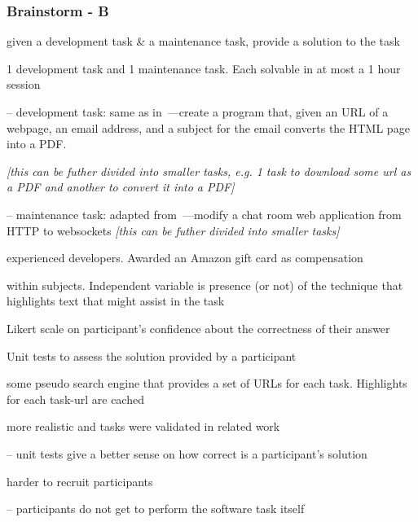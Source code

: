 \clearpage

\subsubsection{Brainstorm - B}

\begin{description}[leftmargin=\parindent, font=\normalfont\itshape]

    
    \item[procedures:] given a development task \& a maintenance task, provide a solution to the task

    
    \item[tasks:] 1 development task and 1 maintenance task. Each solvable in at most a 1 hour session
    
    -- development task: same as in~\cite{Ponzanelli2014b}---create a program that, given an URL of a webpage, an email address, and a subject for the email
    converts the HTML page into a PDF. 
    
    \textit{[this can be futher divided into smaller tasks, e.g. 1 task to download some url as a PDF and another to convert it into a PDF]}
    
    -- maintenance task: adapted from~\cite{Brandt2009a}---modify a chat room web application from HTTP to websockets \textit{[this can be futher divided into smaller tasks]}
    
    
    \item[participants:] experienced developers. Awarded an Amazon gift card as compensation
    
    \item[design:] within subjects. Independent variable is presence (or not) of the technique that highlights text that might assist in the task
    
    \item[measurement-1:] Likert scale on participant's confidence about the correctness of their answer
    
    \item[measurement-2:] Unit tests to assess the solution provided by a participant 
    
    \item[tooling:] some pseudo search engine that provides a set of URLs for each task. Highlights for each task-url are cached
    
    \item[pros:] more realistic and tasks were validated in related work

        -- unit tests give a better sense on how correct is a participant's solution

    \item[cons:]  harder to recruit participants

        -- participants do not get to perform the software task itself
\end{description}
